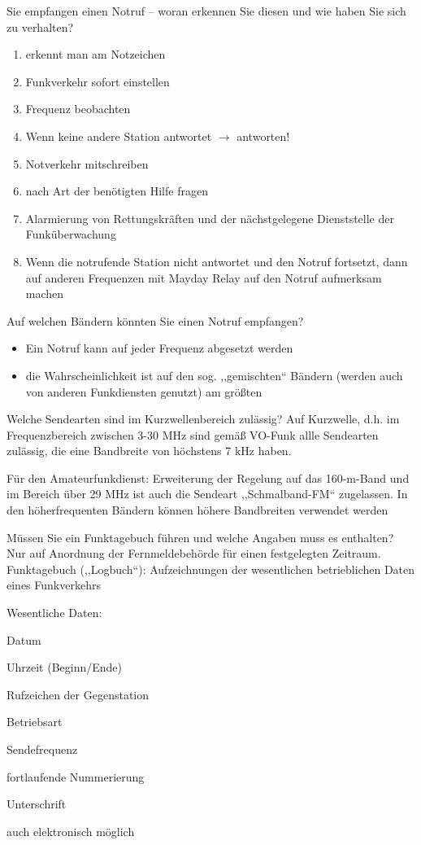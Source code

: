 \documentclass[avery5371,grid,frame,a4paper]{flashcards}
\newcommand{\card}[3]{
  \begin{flashcard}[{\chap} -- #1]{#2}#3\end{flashcard}
}
\begin{document}
\card{34}{Sie empfangen einen Notruf – woran erkennen Sie diesen und wie haben Sie sich zu verhalten?}{
  \footnotesize
  \begin{enumerate}\itemsep0pt
    \item erkennt man am Notzeichen
    \item Funkverkehr sofort einstellen
    \item Frequenz beobachten
    \item Wenn keine andere Station antwortet $\rightarrow$ antworten!
    \item Notverkehr mitschreiben
    \item nach Art der benötigten Hilfe fragen
    \item Alarmierung von Rettungskräften und der nächstgelegene Dienststelle der Funküberwachung
    \item Wenn die notrufende Station nicht antwortet und den Notruf fortsetzt, dann auf anderen Frequenzen mit Mayday Relay auf den Notruf aufmerksam machen
  \end{enumerate}
}
\card{35}{Auf welchen Bändern könnten Sie einen Notruf empfangen?}{
  \begin{itemize}
    \item Ein Notruf kann auf jeder Frequenz abgesetzt werden
    \item die Wahrscheinlichkeit ist auf den sog. ,,gemischten`` Bändern (werden auch von anderen Funkdiensten genutzt) am größten
  \end{itemize}
}
\card{36}{Welche Sendearten sind im Kurzwellenbereich zulässig?}{
  Auf Kurzwelle, d.h. im Frequenzbereich zwischen 3-30 MHz sind gemäß VO-Funk allle Sendearten zulässig, die eine Bandbreite von höchstens 7 kHz haben.

  Für den Amateurfunkdienst: Erweiterung der Regelung auf das 160-m-Band und im Bereich über 29 MHz ist auch die Sendeart ,,Schmalband-FM`` zugelassen. In den höherfrequenten Bändern können höhere Bandbreiten verwendet werden
}
\card{37}{Müssen Sie ein Funktagebuch führen und welche Angaben muss es enthalten?}{
  Nur auf Anordnung der Fernmeldebehörde für einen festgelegten Zeitraum.
  Funktagebuch (,,Logbuch``): Aufzeichnungen der wesentlichen betrieblichen Daten eines Funkverkehrs

  Wesentliche Daten:
  \begin{itemize*}
    \item Datum
    \item Uhrzeit (Beginn/Ende)
    \item Rufzeichen der Gegenstation
    \item Betriebsart
    \item Sendefrequenz
    \item fortlaufende Nummerierung
    \item Unterschrift
    \item auch elektronisch möglich
  \end{itemize*}
}
\end{document}
